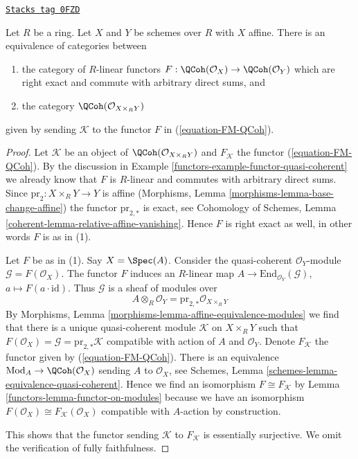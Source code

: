 \begin{lemma}
\label{functors-lemma-functor-quasi-coherent-from-affine}
\href{https://stacks.math.columbia.edu/tag/0FZD}{\texttt{Stacks tag 0FZD}}

Let $R$ be a ring. Let $X$ and $Y$ be schemes over $R$ with $X$ affine.
There is an equivalence of categories between
\begin{enumerate}
\item the category of $R$-linear functors
$F : \QCoh(\mathcal{O}_X) \to \QCoh(\mathcal{O}_Y)$
which are right exact and commute with arbitrary direct sums, and
\item the category $\QCoh(\mathcal{O}_{X \times_R Y})$
\end{enumerate}
given by sending $\mathcal{K}$ to the functor $F$ in (\ref{equation-FM-QCoh}).
\end{lemma}

\begin{proof}

Let $\mathcal{K}$ be an object of $\QCoh(\mathcal{O}_{X \times_R Y})$
and $F_\mathcal{K}$ the functor (\ref{equation-FM-QCoh}). By the discussion in
Example \ref{functors-example-functor-quasi-coherent} we already know that
$F$ is $R$-linear and commutes with arbitrary direct sums.
Since $\text{pr}_2 : X \times_R Y \to Y$ is affine
(Morphisms, Lemma \ref{morphisms-lemma-base-change-affine}) the functor
$\text{pr}_{2, *}$ is exact, see Cohomology of Schemes, Lemma
\ref{coherent-lemma-relative-affine-vanishing}.
Hence $F$ is right exact as well, in other words $F$ is as in (1).

\medskip\noindent
Let $F$ be as in (1). Say $X = \Spec(A)$. Consider the quasi-coherent
$\mathcal{O}_Y$-module $\mathcal{G} = F(\mathcal{O}_X)$.
The functor $F$ induces an $R$-linear map
$A \to \text{End}_{\mathcal{O}_Y}(\mathcal{G})$,
$a \mapsto F(a \cdot \text{id})$. Thus $\mathcal{G}$ is a sheaf of modules over
$$
A \otimes_R \mathcal{O}_Y = \text{pr}_{2, *}\mathcal{O}_{X \times_R Y}
$$
By Morphisms, Lemma \ref{morphisms-lemma-affine-equivalence-modules}
we find that there is a unique quasi-coherent module $\mathcal{K}$
on $X \times_R Y$ such that $F(\mathcal{O}_X) = \mathcal{G} =
\text{pr}_{2, *}\mathcal{K}$ compatible with action
of $A$ and $\mathcal{O}_Y$. Denote $F_\mathcal{K}$ the functor
given by (\ref{equation-FM-QCoh}). There is an equivalence
$\text{Mod}_A \to \QCoh(\mathcal{O}_X)$ sending $A$ to $\mathcal{O}_X$, see
Schemes, Lemma \ref{schemes-lemma-equivalence-quasi-coherent}.
Hence we find an isomorphism $F \cong F_\mathcal{K}$ by
Lemma \ref{functors-lemma-functor-on-modules} because we have an isomorphism
$F(\mathcal{O}_X) \cong F_\mathcal{K}(\mathcal{O}_X)$ compatible with
$A$-action by construction.

\medskip\noindent
This shows that the functor sending $\mathcal{K}$ to $F_\mathcal{K}$
is essentially surjective. We omit the verification of fully faithfulness.
\end{proof}

